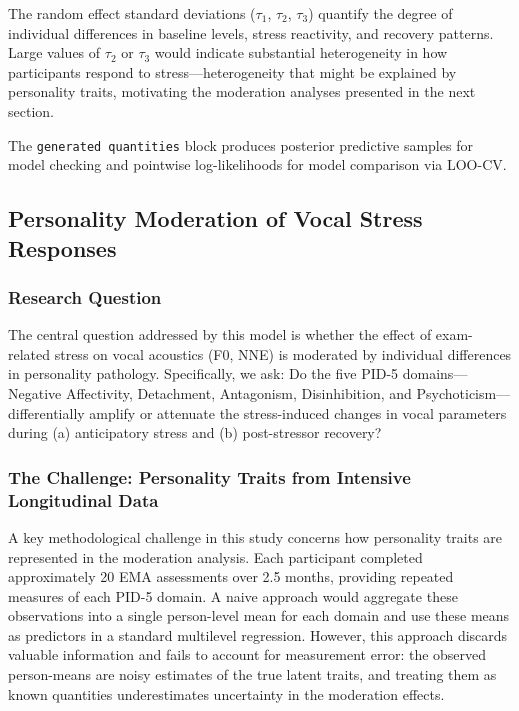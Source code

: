 \documentclass[
  english,
  man,floatsintext]{apa6}
\begin{document}
The random effect standard deviations (\(\tau_1\), \(\tau_2\), \(\tau_3\)) quantify the degree of individual differences in baseline levels, stress reactivity, and recovery patterns. Large values of \(\tau_2\) or \(\tau_3\) would indicate substantial heterogeneity in how participants respond to stress---heterogeneity that might be explained by personality traits, motivating the moderation analyses presented in the next section.

The \texttt{generated\ quantities} block produces posterior predictive samples for model checking and pointwise log-likelihoods for model comparison via LOO-CV.

\subsection{Personality Moderation of Vocal Stress Responses}\label{personality-moderation-of-vocal-stress-responses}

\subsubsection{Research Question}\label{research-question-1}

The central question addressed by this model is whether the effect of exam-related stress on vocal acoustics (F0, NNE) is moderated by individual differences in personality pathology. Specifically, we ask: Do the five PID-5 domains---Negative Affectivity, Detachment, Antagonism, Disinhibition, and Psychoticism---differentially amplify or attenuate the stress-induced changes in vocal parameters during (a) anticipatory stress and (b) post-stressor recovery?

\subsubsection{The Challenge: Personality Traits from Intensive Longitudinal Data}\label{the-challenge-personality-traits-from-intensive-longitudinal-data}

A key methodological challenge in this study concerns how personality traits are represented in the moderation analysis. Each participant completed approximately 20 EMA assessments over 2.5 months, providing repeated measures of each PID-5 domain. A naive approach would aggregate these observations into a single person-level mean for each domain and use these means as predictors in a standard multilevel regression. However, this approach discards valuable information and fails to account for measurement error: the observed person-means are noisy estimates of the true latent traits, and treating them as known quantities underestimates uncertainty in the moderation effects.
\end{document}
